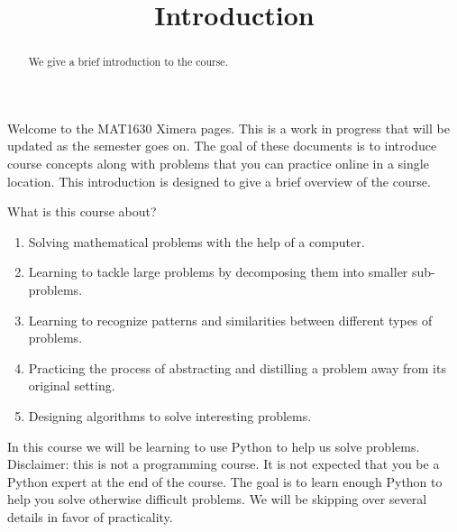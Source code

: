 \documentclass{ximera}
\title{Introduction}
\begin{document}
  
\begin{abstract}  
We give a brief introduction to the course.
\end{abstract}  
\maketitle

Welcome to the MAT1630 Ximera pages. This is a work in progress that will be updated as the semester goes on. The goal of these documents is to introduce course concepts along with problems that you can practice online in a single location. 
This introduction is designed to give a brief overview of the course.

What is this course about?

\begin{enumerate}
	\item Solving mathematical problems with the help of a computer.
	\item Learning to tackle large problems by decomposing them into smaller sub-problems.
	\item Learning to recognize patterns and similarities between different types of problems.
	\item Practicing the process of abstracting and distilling a problem away from its original setting.
	\item Designing algorithms to solve interesting problems.
\end{enumerate}

In this course we will be learning to use Python to help us solve problems. Disclaimer: this is not a programming course. It is not expected that you be a Python expert at the end of the course. The goal is to learn enough Python to help you solve otherwise difficult problems. We will be skipping over several details in favor of practicality. 
\end{document}
